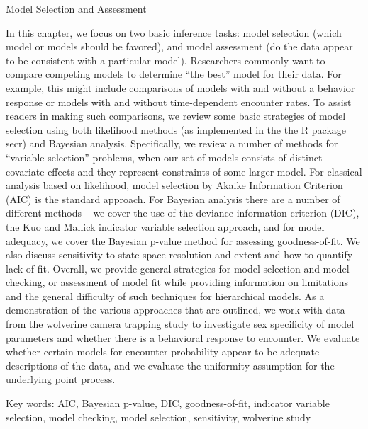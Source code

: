 Model Selection and Assessment


In this chapter, we focus on two basic inference tasks: model
selection (which model or models should be favored), and model
assessment (do the data appear to be consistent with a particular
model).  Researchers commonly want to compare competing models to
determine ``the best'' model for their data.  For example, this might
include comparisons of models with and without a behavior response or
models with and without time-dependent encounter rates.  To assist
readers in making such comparisons, we review some basic strategies of
model selection using both likelihood methods (as implemented in the
the R package secr) and Bayesian analysis.  Specifically, we
review a number of methods for ``variable selection'' problems, when
our set of models consists of distinct covariate effects and they
represent constraints of some larger model.  For classical analysis
based on likelihood, model selection by Akaike Information Criterion
(AIC) is the standard approach.  For Bayesian analysis there are a
number of different methods -- we cover the use of the deviance
information criterion (DIC), the Kuo and Mallick indicator variable
selection approach, and for model adequacy, we cover the Bayesian
p-value method for assessing goodness-of-fit.  We also discuss
sensitivity to state space resolution and extent and how to quantify
lack-of-fit.  Overall, we provide general strategies for model
selection and model checking, or assessment of model fit while
providing information on limitations and the general difficulty of
such techniques for hierarchical models.  As a demonstration of the various approaches that
are outlined, we work with data from the wolverine camera
trapping study to investigate sex specificity of model parameters and
whether there is a behavioral response to encounter.  We evaluate
whether certain models for encounter probability appear to be adequate
descriptions of the data, and we evaluate the uniformity assumption
for the underlying point process.

Key words:  AIC,
Bayesian p-value,
DIC,
goodness-of-fit,
indicator variable selection,
model checking, model selection,
sensitivity, wolverine study




